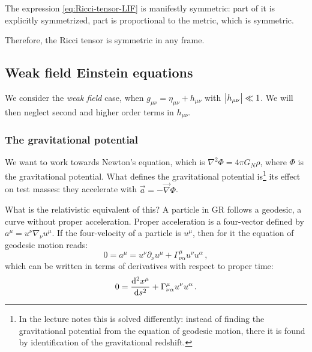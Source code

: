 \documentclass[main.tex]{subfiles}
\begin{document}
The expression \eqref{eq:Ricci-tensor-LIF} is manifestly symmetric: part of it is explicitly symmetrized, part is proportional to the metric, which is symmetric.

Therefore, the Ricci tensor is symmetric in any frame.

\subsection{Weak field Einstein equations}

We consider the \emph{weak field} case, when \(g_{\mu \nu }= \eta_{\mu \nu } + h_{\mu \nu }\) with \(\abs{h_{\mu \nu }} \ll 1 \). We will then neglect second and higher order terms in \(h_{\mu \nu }\).

\subsubsection{The gravitational potential}

We want to work towards Newton's equation, which is \(\nabla^2 \Phi = 4 \pi G_N \rho \), where \(\Phi \) is the gravitational potential.
What defines the gravitational potential is\footnote{In the lecture notes this is solved differently: instead of finding the gravitational potential from the equation of geodesic motion, there it is found by identification of the gravitational redshift.} its effect on test masses: they accelerate with \(\vec{a} = - \vec{\nabla} \Phi \).

What is the relativistic equivalent of this?
A particle in GR follows a geodesic, a curve without proper acceleration.
Proper acceleration is a four-vector defined by \(a^{\mu }=u^{\nu }\nabla_{\nu } u^{\mu }\). If the four-velocity of a particle is \(u^{\mu }\), then for it the equation of geodesic motion reads: 
%
\begin{equation}
  0 = a^{\mu }= u^{\nu }\partial_{\nu }u^{\mu } + \Gamma^{\mu }_{\nu \alpha }u^{\nu} u^{\alpha }
\,,
\end{equation}
%
which can be written in terms of derivatives with respect to proper time: 
%
\begin{equation}
  0 = \dv[2]{x^{ \mu }}{s} + \Gamma^{\mu }_{\nu \alpha } u^{\nu } u^{\alpha }
\,.
\end{equation}
\end{document}

